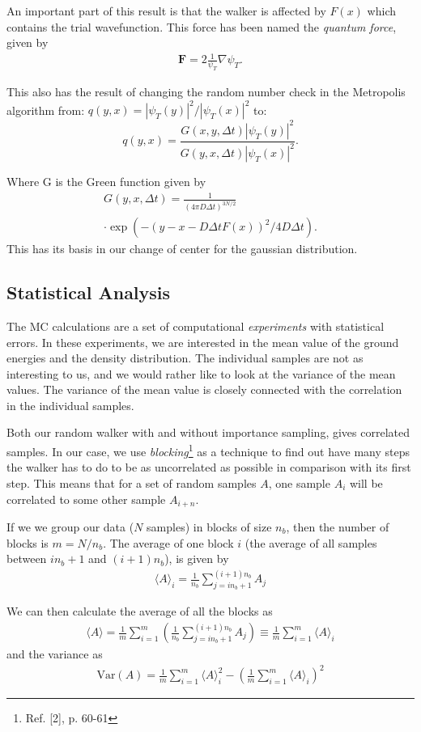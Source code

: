 \documentclass[twocolumns, a4paper,11pt,fleqn]{extarticle}
\newcommand{\eq}[1]{{\small\begin{align*}#1\end{align*}}}
\renewcommand\vec[1]{\boldsymbol{\mathbf{#1}}}
\newcommand{\Var}[1]{\mathrm{Var}(#1)}
\begin{document}
An important part of this result is that the walker is affected by $F(x)$
which contains the trial wavefunction. This force has been named 
the \textit{quantum force}, given by
\begin{align*}
\vec F = 2\frac{1}{\psi_T}\nabla \psi_T. 
\end{align*}

This also has the result of changing the random number check in the 
Metropolis algorithm from:
$q(y,x) = |\psi_T(y)|^2/|\psi_T(x)|^2$ to: 
\[
q(y,x) = \frac{G(x,y,\Delta t)|\psi_T(y)|^2}{G(y,x,\Delta t)|\psi_T(x)|^2}.
\]

Where G is the Green function given by
\eq{
  G(y,x,\Delta t) =  \frac{1}{(4\pi D\Delta t)^{3N/2}}\\ \cdot \exp{\left(-(y-x-D\Delta t F(x))^2/4D\Delta t\right)}.
}
This has its basis in our change of center for the gaussian distribution.

\subsection{Statistical Analysis}
The MC calculations are a set of computational \textit{experiments} 
with statistical errors. In these experiments, we are interested in the mean
value of the ground energies and the density distribution. The 
individual samples are not as interesting to us, and we would rather like
to look at the variance of the mean values. 
The variance of the mean value is closely connected with the correlation
in the individual samples. 


Both our random walker with and without importance sampling, gives correlated
samples. In our case, we use \textit{blocking}\footnote{Ref. [2], p. 60-61}
as a technique to find out have many steps
the walker has to do to be as uncorrelated as possible in comparison with its first step.
This means that for a set of random samples $A$, one sample $A_i$ will be correlated
to some other sample $A_{i+n}$.

If we we group our data ($N$ samples) in blocks of size $n_b$,
then the number of blocks is $m = N/n_b$.
The average of one block $i$ (the average of all samples
between $i n_b + 1$ and $(i+1)n_b$), is given by 
\eq{
\langle A \rangle_i = \frac{1}{n_b}\sum_{j=in_b+1}^{(i+1)n_b} A_j
}

We can then calculate the average of all the blocks as
\eq{
  \langle A \rangle = 
  \frac{1}{m}\sum_{i=1}^m \left(
    \frac{1}{n_b}\sum_{j=in_b+1}^{(i+1)n_b} A_j \right)
  \equiv \frac{1}{m}\sum_{i=1}^m \langle A \rangle_i
}
and the variance as
\eq{
  \Var{A}=
  \frac{1}{m}\sum_{i=1}^m \langle A \rangle_i^2
  -\left(\frac{1}{m}\sum_{i=1}^m \langle A \rangle_i\right)^2
}
\end{document}
